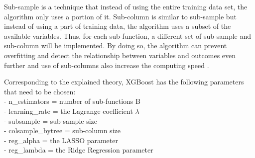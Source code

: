 Sub-sample is a technique that instead of using the entire training data set, 
the algorithm only uses a portion of it.
Sub-column is similar to sub-sample but instead of using a part of training data, 
the algorithm uses a subset of the available variables.
Thus, for each sub-function, a different set of sub-sample and sub-column will 
be implemented. By doing so, the algorithm can prevent overfitting and detect 
the relationship between variables and outcomes even further and use of 
sub-columns also increase the computing speed \cite{chen_xgboost:_2016}.

Corresponding to the explained theory, XGBoost has the following parameters 
that need to be chosen:\\
- n\_estimators = number of sub-functions B\\
- learning\_rate = the Lagrange coefficient $\lambda$\\
- subsample = sub-sample size\\
- colsample\_bytree = sub-column size\\
- reg\_alpha = the LASSO parameter\\
- reg\_lambda = the Ridge Regression parameter

